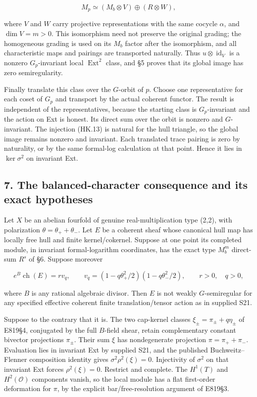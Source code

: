 \[
 M_p\simeq(M_b\otimes V)\oplus(R\otimes W),
 \tag{HK.17}
\]

where \(V\) and \(W\) carry projective representations with the same
cocycle \(\alpha\), and \(\dim V=m>0\). This isomorphism need not preserve
the original grading; the homogeneous grading is used on its
\(M_b\) factor after the isomorphism, and all characteristic maps
and pairings are transported naturally. Thus \(u\otimes\operatorname{id}_V\)
is a nonzero \(G_p\)-invariant local \(\operatorname{Ext}^2\) class, and §5 proves that
its global image has zero semiregularity.

Finally translate this class over the \(G\)-orbit of \(p\). Choose one
representative for each coset of \(G_p\) and transport by the actual
coherent functor. The result is independent of the representatives,
because the starting class is \(G_p\)-invariant and the action on Ext
is honest. Its direct sum over the orbit is nonzero and \(G\)-invariant.
The injection (HK.13) is natural for the hull triangle, so the
global image remains nonzero and invariant. Each translated
trace pairing is zero by naturality, or by the same formal-log
calculation at that point. Hence it lies in \(\ker\sigma^2\) on invariant Ext.

\subsection{7. The balanced-character consequence and its exact hypotheses}\label{SF-E846:s7}

Let \(X\) be an abelian fourfold of genuine real-multiplication type
(2,2), with polarization \(\theta=\theta_++\theta_-\). Let \(E\) be a coherent
sheaf whose canonical hull map has locally free hull and finite
kernel/cokernel. Suppose at one point its completed module, in
invariant formal-logarithm coordinates, has the exact type
\(M_b^m\) direct-sum \(R^s\) of §6. Suppose moreover

\[
 e^B\operatorname{ch}(E)=r v_q,
 \qquad
 v_q=(1-q\theta_+^2/2)(1-q\theta_-^2/2),
 \qquad r>0,\quad q>0,
 \tag{HK.18}
\]

where \(B\) is any rational algebraic divisor. Then \(E\) is not weakly
\(G\)-semiregular for any specified effective coherent finite
translation/tensor action as in supplied S21.

Suppose to the contrary that it is. The two cap-kernel classes
\(\xi_\pm=\pi_\pm+q\eta_\pm\) of E819§4, conjugated by the full \(B\)-field shear,
retain complementary constant bivector projections \(\pi_\pm\). Their
sum \(\xi\) has nondegenerate projection \(\pi=\pi_++\pi_-\). Evaluation lies
in invariant Ext by supplied S21, and the published
Buchweitz--Flenner composition identity gives \(\sigma^2\rho^2(\xi)=0\).
Injectivity of \(\sigma^2\) on that invariant Ext forces \(\rho^2(\xi)=0\).
Restrict and complete. The \(H^1(T)\) and \(H^2(\mathcal O)\) components vanish,
so the local module has a flat first-order deformation for \(\pi\),
by the explicit bar/free-resolution argument of E819§3.

